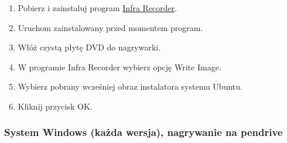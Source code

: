\begin{enumerate}[label=\protect\circled{\arabic*}]
\item Pobierz i zainstaluj program \href{http://infrarecorder.org/?page_id=5}{Infra Recorder}.
\item Uruchom zainstalowany przed momentem program.
\item Włóż czystą płytę DVD do nagrywarki.
\item W programie Infra Recorder wybierz opcję \textcolor{ubuntu_orange}{Write Image}.
\item Wybierz pobrany wcześniej obraz instalatora systemu Ubuntu.
\item Kliknij przycisk \textcolor{ubuntu_orange}{OK}.
\end{enumerate}
\clearpage
\subsubsection{System Windows (każda wersja), nagrywanie na pendrive}
